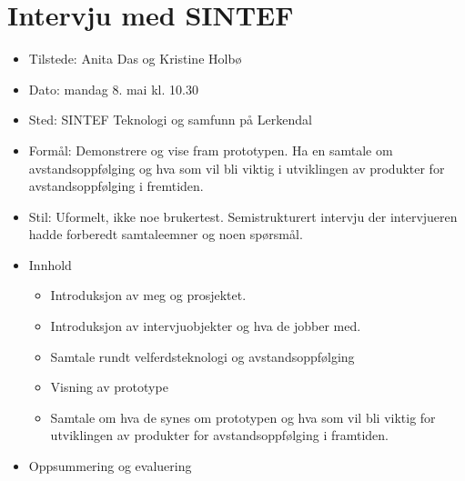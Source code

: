 \section{Intervju med SINTEF}\label{intervju-med-sintef}

\begin{itemize}
\tightlist
\item
  Tilstede: Anita Das og Kristine Holbø
\item
  Dato: mandag 8. mai kl. 10.30
\item
  Sted: SINTEF Teknologi og samfunn på Lerkendal
\item
  Formål: Demonstrere og vise fram prototypen. Ha en samtale om
  avstandsoppfølging og hva som vil bli viktig i utviklingen av
  produkter for avstandsoppfølging i fremtiden.
\item
  Stil: Uformelt, ikke noe brukertest. Semistrukturert intervju der
  intervjueren hadde forberedt samtaleemner og noen spørsmål.
\item
  Innhold

  \begin{itemize}
  \tightlist
  \item
    Introduksjon av meg og prosjektet.
  \item
    Introduksjon av intervjuobjekter og hva de jobber med.
  \item
    Samtale rundt velferdsteknologi og avstandsoppfølging
  \item
    Visning av prototype
  \item
    Samtale om hva de synes om prototypen og hva som vil bli viktig for
    utviklingen av produkter for avstandsoppfølging i framtiden.
  \end{itemize}
\item
  Oppsummering og evaluering


\end{itemize}
